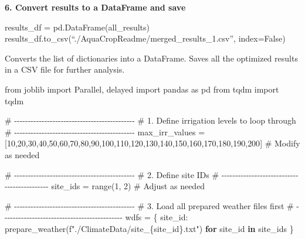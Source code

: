 \documentclass[
  letterpaper,
  DIV=11,
  numbers=noendperiod]{scrartcl}
\newenvironment{Shaded}{\begin{snugshade}}{\end{snugshade}}
\newcommand{\BuiltInTok}[1]{\textcolor[rgb]{0.00,0.23,0.31}{#1}}
\newcommand{\CommentTok}[1]{\textcolor[rgb]{0.37,0.37,0.37}{#1}}
\newcommand{\ControlFlowTok}[1]{\textcolor[rgb]{0.00,0.23,0.31}{\textbf{#1}}}
\newcommand{\DecValTok}[1]{\textcolor[rgb]{0.68,0.00,0.00}{#1}}
\newcommand{\ImportTok}[1]{\textcolor[rgb]{0.00,0.46,0.62}{#1}}
\newcommand{\KeywordTok}[1]{\textcolor[rgb]{0.00,0.23,0.31}{\textbf{#1}}}
\newcommand{\NormalTok}[1]{\textcolor[rgb]{0.00,0.23,0.31}{#1}}
\newcommand{\OperatorTok}[1]{\textcolor[rgb]{0.37,0.37,0.37}{#1}}
\newcommand{\SpecialCharTok}[1]{\textcolor[rgb]{0.37,0.37,0.37}{#1}}
\newcommand{\SpecialStringTok}[1]{\textcolor[rgb]{0.13,0.47,0.30}{#1}}
\begin{document}
\textbf{6. Convert results to a DataFrame and save}

results\_df = pd.DataFrame(all\_results)
results\_df.to\_csv(``./AquaCropReadme/merged\_results\_1.csv'',
index=False)

Converts the list of dictionaries into a DataFrame. Saves all the
optimized results in a CSV file for further analysis.

\begin{Shaded}
\begin{Highlighting}[]
\ImportTok{from}\NormalTok{ joblib }\ImportTok{import}\NormalTok{ Parallel, delayed}
\ImportTok{import}\NormalTok{ pandas }\ImportTok{as}\NormalTok{ pd}
\ImportTok{from}\NormalTok{ tqdm }\ImportTok{import}\NormalTok{ tqdm}

\CommentTok{\# {-}{-}{-}{-}{-}{-}{-}{-}{-}{-}{-}{-}{-}{-}{-}{-}{-}{-}{-}{-}{-}{-}{-}{-}{-}{-}{-}{-}{-}{-}{-}{-}{-}{-}{-}{-}{-}{-}{-}{-}{-}{-}{-}{-}}
\CommentTok{\# 1. Define irrigation levels to loop through}
\CommentTok{\# {-}{-}{-}{-}{-}{-}{-}{-}{-}{-}{-}{-}{-}{-}{-}{-}{-}{-}{-}{-}{-}{-}{-}{-}{-}{-}{-}{-}{-}{-}{-}{-}{-}{-}{-}{-}{-}{-}{-}{-}{-}{-}{-}{-}}
\NormalTok{max\_irr\_values }\OperatorTok{=}\NormalTok{ [}\DecValTok{10}\NormalTok{,}\DecValTok{20}\NormalTok{,}\DecValTok{30}\NormalTok{,}\DecValTok{40}\NormalTok{,}\DecValTok{50}\NormalTok{,}\DecValTok{60}\NormalTok{,}\DecValTok{70}\NormalTok{,}\DecValTok{80}\NormalTok{,}\DecValTok{90}\NormalTok{,}\DecValTok{100}\NormalTok{,}\DecValTok{110}\NormalTok{,}\DecValTok{120}\NormalTok{,}\DecValTok{130}\NormalTok{,}\DecValTok{140}\NormalTok{,}\DecValTok{150}\NormalTok{,}\DecValTok{160}\NormalTok{,}\DecValTok{170}\NormalTok{,}\DecValTok{180}\NormalTok{,}\DecValTok{190}\NormalTok{,}\DecValTok{200}\NormalTok{]}
\CommentTok{\# Modify as needed}

\CommentTok{\# {-}{-}{-}{-}{-}{-}{-}{-}{-}{-}{-}{-}{-}{-}{-}{-}{-}{-}{-}{-}{-}{-}{-}{-}{-}{-}{-}{-}{-}{-}{-}{-}{-}{-}{-}{-}{-}{-}{-}{-}{-}{-}{-}{-}}
\CommentTok{\# 2. Define site IDs}
\CommentTok{\# {-}{-}{-}{-}{-}{-}{-}{-}{-}{-}{-}{-}{-}{-}{-}{-}{-}{-}{-}{-}{-}{-}{-}{-}{-}{-}{-}{-}{-}{-}{-}{-}{-}{-}{-}{-}{-}{-}{-}{-}{-}{-}{-}{-}}
\NormalTok{site\_ids }\OperatorTok{=} \BuiltInTok{range}\NormalTok{(}\DecValTok{1}\NormalTok{, }\DecValTok{2}\NormalTok{)  }\CommentTok{\# Adjust as needed}

\CommentTok{\# {-}{-}{-}{-}{-}{-}{-}{-}{-}{-}{-}{-}{-}{-}{-}{-}{-}{-}{-}{-}{-}{-}{-}{-}{-}{-}{-}{-}{-}{-}{-}{-}{-}{-}{-}{-}{-}{-}{-}{-}{-}{-}{-}{-}}
\CommentTok{\# 3. Load all prepared weather files first}
\CommentTok{\# {-}{-}{-}{-}{-}{-}{-}{-}{-}{-}{-}{-}{-}{-}{-}{-}{-}{-}{-}{-}{-}{-}{-}{-}{-}{-}{-}{-}{-}{-}{-}{-}{-}{-}{-}{-}{-}{-}{-}{-}{-}{-}{-}{-}}
\NormalTok{wdfs }\OperatorTok{=}\NormalTok{ \{}
\NormalTok{    site\_id: prepare\_weather(}\SpecialStringTok{f"./ClimateData/site\_}\SpecialCharTok{\{}\NormalTok{site\_id}\SpecialCharTok{\}}\SpecialStringTok{.txt"}\NormalTok{)}
    \ControlFlowTok{for}\NormalTok{ site\_id }\KeywordTok{in}\NormalTok{ site\_ids}
\NormalTok{\}}


\end{Highlighting}
\end{Shaded}
\end{document}
